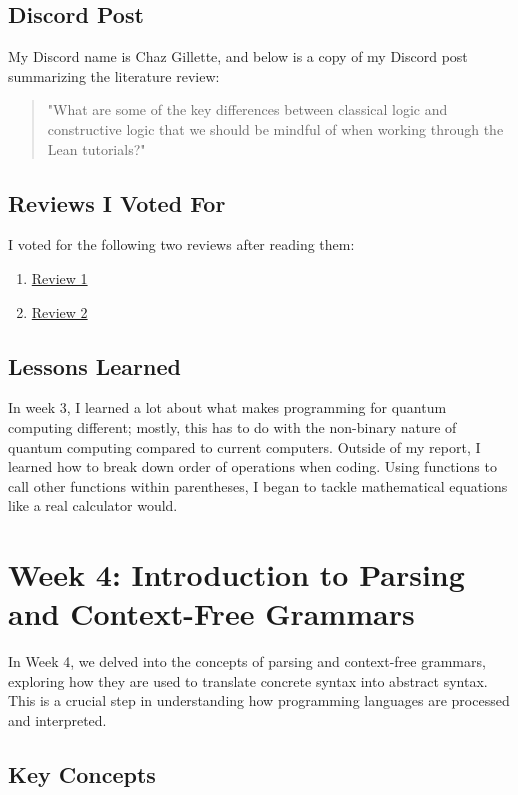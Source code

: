 \documentclass{article}
\begin{document}
\subsection*{Discord Post}

My Discord name is Chaz Gillette, and below is a copy of my Discord post summarizing the literature review:

\begin{quote}
\small
"What are some of the key differences between classical logic and constructive logic that we should be mindful of when working through the Lean tutorials?"
\end{quote}

\subsection*{Reviews I Voted For}
I voted for the following two reviews after reading them:

\begin{enumerate}
    \item \href{https://github.com/mdrivas/CPSC353-Assignment3/blob/main/README.md}{Review 1}
    \item \href{https://github.com/ATacoDev/LitReview354}{Review 2}
\end{enumerate}

\subsection*{Lessons Learned}
In week 3, I learned a lot about what makes programming for quantum computing different; mostly, this has to do with the non-binary nature of quantum computing compared to current computers. Outside of my report, I learned how to break down order of operations when coding. Using functions to call other functions within parentheses, I began to tackle mathematical equations like a real calculator would.

\section{Week 4: Introduction to Parsing and Context-Free Grammars}
\label{sec:week4}

In Week 4, we delved into the concepts of parsing and context-free grammars, exploring how they are used to translate concrete syntax into abstract syntax. This is a crucial step in understanding how programming languages are processed and interpreted.

\subsection*{Key Concepts}
\end{document}
